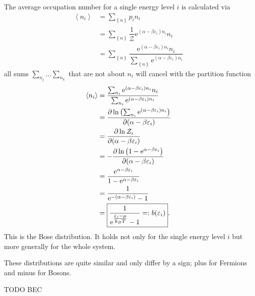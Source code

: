 \documentclass[a4paper,10pt]{article}
\numberwithin{equation}{section}
\begin{document}
\begin{multicols}{2}
The average occupation number for a single energy level $i$ is calculated via
\begin{align} 
  \left\langle n_i\right\rangle  &= \sum_{ \left\{n\right\}}^{}p_i n_i\\
                                 &= \sum_{ \left\{n\right\}}^{}\dfrac{1}{\mathcal{Z}}\text{e}^{(\alpha -\beta \varepsilon _i)n_i}n_i\\
                                 &= \sum_{ \left\{n\right\}}^{}\dfrac{\text{e}^{(\alpha -\beta \varepsilon _i)n_i}n_i}{\sum_{ \left\{n\right\}}^{}\text{e}^{(\alpha -\beta \varepsilon _i)n_i}}
\end{align} 
all sums $\sum_{n_j}^{}\hdots \sum_{n_k}^{}$ that are not about $n_i$ will cancel with the partition function
\begin{align} 
  \left\langle n_i\right\rangle  &= \dfrac{\sum_{n_i}^{}\text{e}^{(\alpha -\beta \varepsilon _i)n_i}n_i}{\sum_{n_i}^{}\text{e}^{(\alpha -\beta \varepsilon _i)n_i}}\\
                                 &= \diffp[]{\ln\left(\sum_{n_i}^{}\text{e}^{(\alpha -\beta \varepsilon _i)n_i}\right)}{(\alpha -\beta \varepsilon _i)}\\
                                 &= \diffp[]{\ln \mathcal{Z}_i}{(\alpha -\beta \varepsilon _i)}\\
                                 &= -\diffp[]{\ln \left(1-\text{e}^{\alpha -\beta \varepsilon _i}\right)}{(\alpha -\beta \varepsilon _i)}\\
                                 &= \dfrac{\text{e}^{\alpha -\beta \varepsilon _i}}{1-\text{e}^{\alpha -\beta \varepsilon _i}}\\
                                 &=\dfrac{1}{\text{e}^{-(\alpha -\beta \varepsilon _i)}-1}\\
                                 &=\boxed{\dfrac{1}{\text{e}^{\tfrac{\varepsilon _i-\mu }{k_BT}}-1}=:b(\varepsilon _i)}
.\end{align} 
This is the Bose distribution.
It holds not only for the single energy level $i$ but more generally for the whole system.

These distributions are quite similar and only differ by a sign; plus for Fermions and minus for Bosons.

TODO BEC


\end{multicols}
\end{document}
